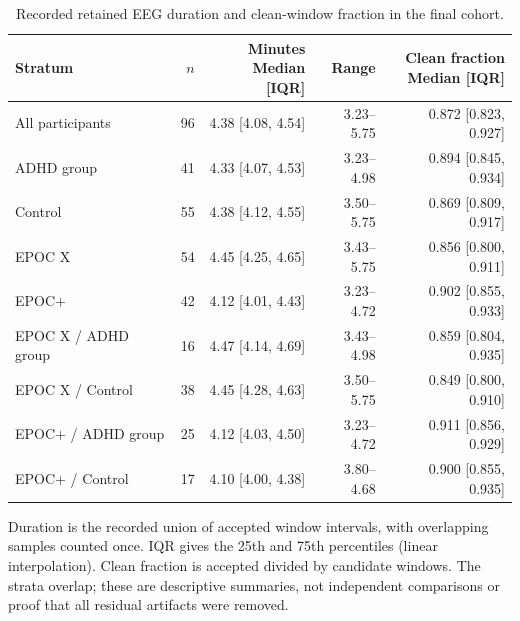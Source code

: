 \begin{table}[!htbp]
\centering\small
\caption{Recorded retained EEG duration and clean-window fraction in the final cohort.}
\label{tab:duration}
\begin{tabular}{lrrrr}
\toprule
Stratum & $n$ & \shortstack{Minutes\\Median [IQR]} & Range & \shortstack{Clean fraction\\Median [IQR]}\\
\midrule
All participants & 96 & 4.38 [4.08, 4.54] & 3.23--5.75 & 0.872 [0.823, 0.927]\\
ADHD group & 41 & 4.33 [4.07, 4.53] & 3.23--4.98 & 0.894 [0.845, 0.934]\\
Control & 55 & 4.38 [4.12, 4.55] & 3.50--5.75 & 0.869 [0.809, 0.917]\\
EPOC X & 54 & 4.45 [4.25, 4.65] & 3.43--5.75 & 0.856 [0.800, 0.911]\\
EPOC+ & 42 & 4.12 [4.01, 4.43] & 3.23--4.72 & 0.902 [0.855, 0.933]\\
EPOC X / ADHD group & 16 & 4.47 [4.14, 4.69] & 3.43--4.98 & 0.859 [0.804, 0.935]\\
EPOC X / Control & 38 & 4.45 [4.28, 4.63] & 3.50--5.75 & 0.849 [0.800, 0.910]\\
EPOC+ / ADHD group & 25 & 4.12 [4.03, 4.50] & 3.23--4.72 & 0.911 [0.856, 0.929]\\
EPOC+ / Control & 17 & 4.10 [4.00, 4.38] & 3.80--4.68 & 0.900 [0.855, 0.935]\\
\bottomrule
\end{tabular}
\par\smallskip\begin{minipage}{\textwidth}\footnotesize Duration is the recorded union of accepted window intervals, with overlapping samples counted once. IQR gives the 25th and 75th percentiles (linear interpolation). Clean fraction is accepted divided by candidate windows. The strata overlap; these are descriptive summaries, not independent comparisons or proof that all residual artifacts were removed.
\end{minipage}
\end{table}
